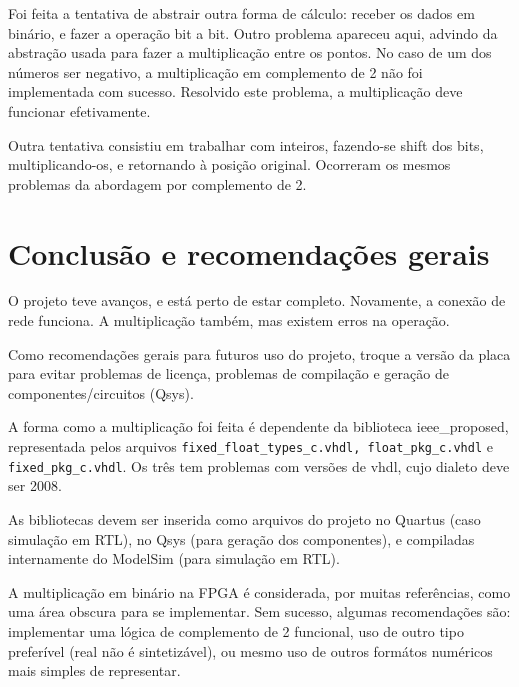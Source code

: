 \documentclass [12pt,oneside] {article}
\begin{document}
	Foi feita a tentativa de abstrair outra forma de cálculo:
receber os dados em binário, e fazer a operação bit a bit. Outro
problema apareceu aqui, advindo da abstração usada para fazer a multiplicação entre os pontos. No caso de
um dos números ser negativo, a multiplicação em complemento de 2
não foi implementada com sucesso. Resolvido este problema, a
multiplicação deve funcionar efetivamente.

	Outra tentativa consistiu em trabalhar com inteiros,
fazendo-se shift dos bits, multiplicando-os, e retornando à posição
original. Ocorreram os mesmos problemas da abordagem por complemento
de 2.


\section{Conclusão e recomendações gerais}

	O projeto teve avanços, e está perto de estar completo.
Novamente, a conexão de rede funciona. A multiplicação também, mas existem erros na
operação.

	Como recomendações gerais para futuros uso do projeto, troque
a versão da placa para evitar problemas de licença, problemas de
compilação e geração de componentes/circuitos (Qsys).

	A forma como a multiplicação foi feita é dependente da
biblioteca ieee\_proposed, representada pelos arquivos
\texttt{fixed\_float\_types\_c.vhdl, float\_pkg\_c.vhdl} e
\texttt{fixed\_pkg\_c.vhdl}. Os três tem problemas com versões de
vhdl, cujo dialeto deve ser 2008.

	As bibliotecas devem ser inserida como arquivos do projeto no
Quartus (caso simulação em RTL), no Qsys (para geração dos
componentes), e compiladas internamente do ModelSim (para simulação em
RTL).

	A multiplicação em binário na FPGA é considerada, por muitas
referências, como uma área obscura para se implementar. Sem sucesso,
algumas recomendações são: implementar uma lógica de complemento de 2
funcional, uso de outro tipo preferível (real não é sintetizável), ou
mesmo uso de outros formátos numéricos mais simples de representar.
\end{document}
